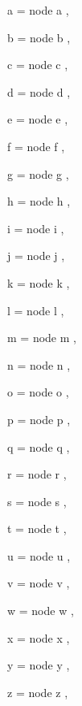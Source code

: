 a = {
  node {a}
},

b = {
  node {b}
},

c = {
  node {c}
},

d = {
  node {d}
},

e = {
  node {e}
},

f = {
  node {f}
},

g = {
  node {g}
},

h = {
  node {h}
},

i = {
  node {i}
},

j = {
  node {j}
},

k = {
  node {k}
},

l = {
  node {l}
},

m = {
  node {m}
},

n = {
  node {n}
},

o = {
  node {o}
},

p = {
  node {p}
},

q = {
  node {q}
},

r = {
  node {r}
},

s = {
  node {s}
},

t = {
  node {t}
},

u = {
  node {u}
},

v = {
  node {v}
},

w = {
  node {w}
},

x = {
  node {x}
},

y = {
  node {y}
},

z = {
  node {z}
},